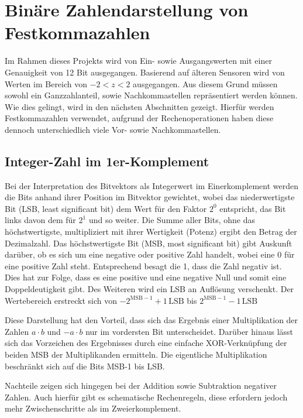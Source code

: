 \section{Binäre Zahlendarstellung von Festkommazahlen}

Im Rahmen dieses Projekts wird von Ein- sowie Ausgangswerten mit einer Genauigkeit von 12 Bit ausgegangen.
Basierend auf älteren Sensoren wird von Werten im Bereich von $-2 < z < 2$ ausgegangen.
Aus diesem Grund müssen sowohl ein Ganzzahlanteil, sowie Nachkommastellen repräsentiert werden können. Wie dies gelingt, wird in den nächsten Abschnitten gezeigt.
Hierfür werden Festkommazahlen verwendet, aufgrund der Rechenoperationen haben diese dennoch unterschiedlich viele Vor- sowie Nachkommastellen.


\subsection{Integer-Zahl im 1er-Komplement}
Bei der Interpretation des Bitvektors als Integerwert im Einerkomplement werden die Bits anhand ihrer Position im Bitvektor gewichtet, wobei das niederwertigste Bit 
(LSB, least significant bit) dem Wert für den Faktor $2^0$ entspricht, das Bit links davon dem für $2^1$ und so weiter. Die Summe aller Bits, ohne das höchstwertigste, 
multipliziert mit ihrer Wertigkeit (Potenz) ergibt den Betrag der Dezimalzahl. Das höchstwertigste Bit (MSB, most significant bit) gibt Auskunft darüber, ob es sich 
um eine negative oder positive Zahl handelt, wobei eine 0 für eine positive Zahl steht. Entsprechend besagt die 1, dass die Zahl negativ ist.
Dies hat zur Folge, dass es eine positive und eine negative Null und somit eine Doppeldeutigkeit gibt. Des Weiteren wird
ein LSB an Auflösung verschenkt. Der Wertebereich erstreckt sich von $-2^{\mathrm{MSB}-1}+1\,\mathrm{LSB}$ bis $2^{\mathrm{MSB}-1}-1\,\mathrm{LSB}$

Diese Darstellung hat den Vorteil, dass sich das Ergebnis einer Multiplikation der Zahlen $a \cdot b$ und $-a \cdot b$ nur im vordersten Bit unterscheidet. Darüber hinaus
lässt sich das Vorzeichen des Ergebnisses durch eine einfache XOR-Verknüpfung der beiden MSB der Multiplikanden ermitteln. 
Die eigentliche Multiplikation beschränkt sich auf die Bits MSB-1 bis LSB.

Nachteile zeigen sich hingegen bei der Addition sowie Subtraktion negativer Zahlen. Auch hierfür gibt es schematische Rechenregeln, diese erfordern jedoch mehr 
Zwischenschritte als im Zweierkomplement. 


